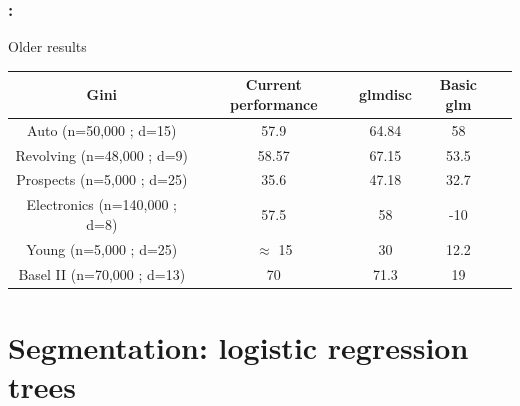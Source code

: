 \documentclass[english,xcolor={rgb,dvipsnames,table,usenames}]{beamer}
\begin{document}
\begin{frame}
\frametitle{\secname : \subsecname}

Older results

\begin{table}[t]
\begin{center}
\begin{adjustbox}{max width=0.99\textwidth}

\begin{tabular}{|c||c|c|c|c|}
\hline  Gini & Current performance & \textbf{glmdisc} & Basic \textbf{glm} \\
\hline
\hline   Auto (n=50,000 ; d=15) & 57.9 & \textcolor{OliveGreen}{64.84} & 58\\
\hline   Revolving (n=48,000 ; d=9) & 58.57 & \textcolor{OliveGreen}{67.15} & 53.5 \\
\hline   Prospects (n=5,000 ; d=25) & 35.6 & \textcolor{OliveGreen}{47.18} & 32.7\\
\hline   Electronics (n=140,000 ; d=8) & \textcolor{OliveGreen}{57.5} & \textcolor{OliveGreen}{58} & -10 \\
\hline   Young (n=5,000 ; d=25) & $\approx$ 15 & \textcolor{OliveGreen}{30} & 12.2 \\
\hline   Basel II (n=70,000 ; d=13) & \textcolor{OliveGreen}{70} & \textcolor{OliveGreen}{71.3} & 19 \\
\hline 
\end{tabular}

\end{adjustbox}
\end{center}
\end{table}


\end{frame}





\section{Segmentation: logistic regression trees}
\end{document}
